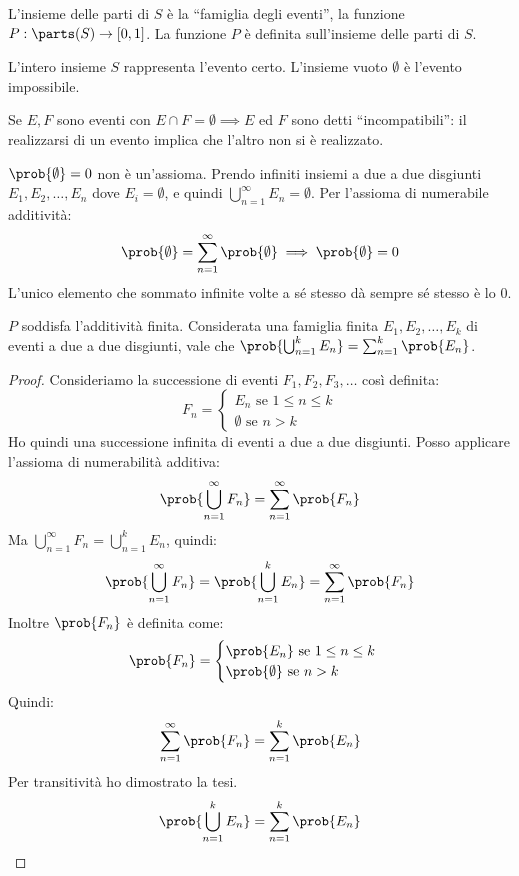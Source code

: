 L'insieme delle parti di $S$ \`e la ``famiglia degli eventi'', la funzione $P: \parts(S) \to [0,1]$. La funzione $P$ \`e definita sull'insieme delle parti di $S$.

L'intero insieme $S$ rappresenta l'evento certo. L'insieme vuoto $\emptyset$ \`e l'evento impossibile.

Se $E, F$ sono eventi con $E \cap F = \emptyset \implies E$ ed $F$ sono detti ``incompatibili'': il realizzarsi di un evento implica che l'altro non si \`e realizzato. 

$\prob{\emptyset} = 0$ non \`e un'assioma. Prendo infiniti insiemi a due a due disgiunti $E_1, E_2, \dots, E_n$ dove $E_i = \emptyset$, e quindi $\bigcup_{n=1}^{\infty} E_n = \emptyset$. Per l'assioma di numerabile additivit\`a:
\[
\prob{\emptyset} = \sum_{n=1}^{\infty} \prob{\emptyset} \implies \prob{\emptyset} = 0
\]
L'unico elemento che sommato infinite volte a s\'e stesso d\`a sempre s\'e stesso \`e lo 0.

\begin{prop}
$P$ soddisfa l'additivit\`a finita. Considerata una famiglia finita $E_1, E_2, \dots, E_k$ di eventi a due a due disgiunti, vale che $\prob{\bigcup_{n=1}^k E_n} = \sum_{n=1}^k \prob{E_n}$.
\end{prop}
\begin{proof}
Consideriamo la successione di eventi $F_1, F_2, F_3, \dots$ cos\`i definita:
\[
F_n =
\begin{cases}
E_n \text{ se } 1 \le n \le k \\
\emptyset \text{ se } n > k
\end{cases}
\]
Ho quindi una successione infinita di eventi a due a due disgiunti. Posso applicare l'assioma di numerabilit\`a additiva:
\[
\prob{\bigcup_{n = 1}^{\infty} F_n} = \sum_{n = 1}^{\infty} \prob{F_n}
\]
Ma $\bigcup_{n = 1}^{\infty} F_n = \bigcup_{n = 1}^{k} E_n$, quindi:
\[
\prob{\bigcup_{n = 1}^{\infty} F_n} =
\prob{\bigcup_{n = 1}^{k} E_n} =
\sum_{n = 1}^{\infty} \prob{F_n}
\]
Inoltre $\prob{F_n}$ \`e definita come:
\[
\prob{F_n} =
\begin{cases}
\prob{E_n} \text{ se } 1 \le n \le k \\
\prob{\emptyset} \text{ se } n >k
\end{cases}
\]
Quindi:
\[
\sum_{n = 1}^{\infty} \prob{F_n} =
\sum_{n = 1}^{k} \prob{E_n}
\]
Per transitivit\`a ho dimostrato la tesi.
\[
\prob{\bigcup_{n=1}^k E_n} = \sum_{n=1}^k \prob{E_n}
\]
\end{proof}

